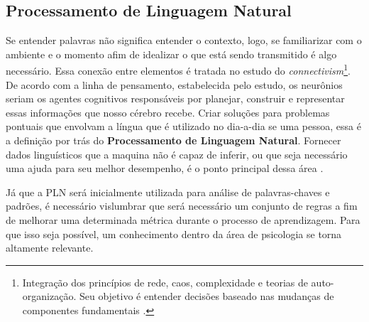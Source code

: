 \subsection{Processamento de Linguagem Natural}
Se entender palavras não significa entender o contexto, logo, se familiarizar com o ambiente e o momento afim de idealizar o que está sendo transmitido é algo necessário. Essa conexão entre elementos é tratada no estudo do \textit{connectivism}\footnote{Integração dos princípios de rede, caos, complexidade e teorias de auto-organização. Seu objetivo é entender decisões baseado nas mudanças de componentes fundamentais \cite{siemens2014connectivism}.}. De acordo com a linha de pensamento, estabelecida pelo estudo, os neurônios seriam os agentes cognitivos responsáveis por planejar, construir e representar essas informações que nosso cérebro recebe. Criar soluções para problemas pontuais que envolvam a língua que é utilizado no dia-a-dia se uma pessoa, essa é a definição por trás do \textbf{Processamento de Linguagem Natural}. Fornecer dados linguísticos que a maquina não é capaz de inferir, ou que seja necessário uma ajuda para seu melhor desempenho, é o ponto principal dessa área \cite{brandura1996, maria2015npl}.

Já que a PLN será inicialmente utilizada para análise de palavras-chaves e padrões, é necessário vislumbrar que será necessário um conjunto de regras a fim de melhorar uma determinada métrica durante o processo de aprendizagem. Para que isso seja possível, um conhecimento dentro da área de psicologia se torna altamente relevante.
